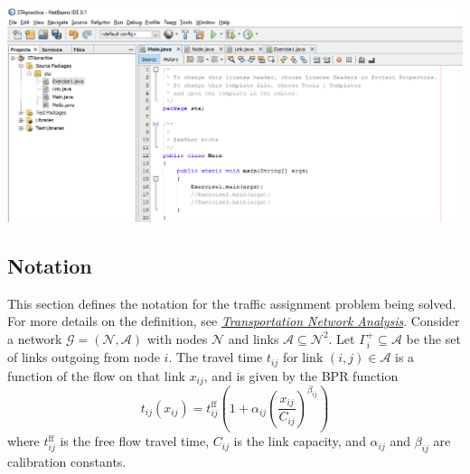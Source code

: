 \documentclass[12pt]{article}
\newcommand{\N}{\mathcal{N}}
\newcommand{\A}{\mathcal{A}}
\newcommand{\tff}{t^{\mathrm{ff}}_{ij}}
\begin{document}
\begin{center}
\includegraphics[width=\textwidth]{netbeans1.png}
\end{center}




\subsection{Notation}

This section defines the notation for the traffic assignment problem being solved. 
For more details on the definition, see \href{https://sboyles.github.io/blubook.html}{\textit{Transportation Network Analysis}}. 
Consider a network $\mathcal{G}=(\N,\A)$ with nodes $\N$ and links $\A\subseteq \N^2$.  Let $\Gamma^+_i\subseteq\A$ be the set of links outgoing from node $i$. The travel time $t_{ij}$ for link $(i,j)\in\A$ is a function of the flow on that link $x_{ij}$, and is given by the BPR function
\begin{equation}
	t_{ij}(x_{ij}) = \tff \left(1+\alpha_{ij} \left(\frac{x_{ij}}{C_{ij}}\right)^{\beta_{ij}}\right) \label{bpr}
\end{equation}
where $\tff$ is the free flow travel time, $C_{ij}$ is the link capacity, and $\alpha_{ij}$ and $\beta_{ij}$ are calibration constants.
\end{document}
